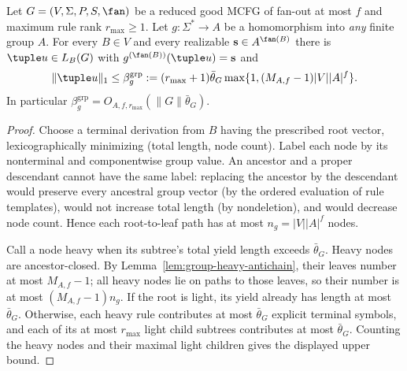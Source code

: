 \begin{theorem}
\label{thm:group-typed-shortest}
Let $G=(V,\Sigma,P,S,\fan)$ be a reduced good MCFG
of fan-out at most $f$ and maximum rule rank
$r_{\max}\ge1$.  Let $g:\Sigma^*\to A$ be a
homomorphism into \emph{any} finite group $A$.
For every $B\in V$ and every realizable
$\mathbf s\in A^{\fan(B)}$ there is
$\tuple u\in L_B(G)$ with
$g^{(\fan(B))}(\tuple u)=\mathbf s$ and
\[
 \|\tuple u\|_1\le
 \beta_g^{\mathrm{grp}}:=
 (r_{\max}+1)\bar\theta_G
 \max\{1,(M_{A,f}-1)|V||A|^f\}.
\]
In particular $\beta_g^{\mathrm{grp}}
=O_{A,f,r_{\max}}(\|G\|\bar\theta_G)$.
\end{theorem}
\begin{proof}
Choose a terminal derivation from $B$ having the
prescribed root vector, lexicographically minimizing
(total length, node count).  Label each node by
its nonterminal and componentwise group value.
An ancestor and a proper descendant cannot have
the same label: replacing the ancestor by the
descendant would preserve every ancestral group
vector (by the ordered evaluation of rule templates),
would not increase total length (by nondeletion),
and would decrease node count.  Hence each
root-to-leaf path has at most
$n_g=|V||A|^f$ nodes.

Call a node heavy when its subtree's total yield
length exceeds $\bar\theta_G$.  Heavy nodes are
ancestor-closed.  By
Lemma~\ref{lem:group-heavy-antichain},
their leaves number at most $M_{A,f}-1$;
all heavy nodes lie on paths to those leaves,
so their number is at most
$(M_{A,f}-1)n_g$.
If the root is light, its yield already has
length at most $\bar\theta_G$.
Otherwise, each heavy rule contributes at most
$\bar\theta_G$ explicit terminal symbols, and
each of its at most $r_{\max}$ light child
subtrees contributes at most $\bar\theta_G$.
Counting the heavy nodes and their maximal light
children gives the displayed upper bound.
\end{proof}


